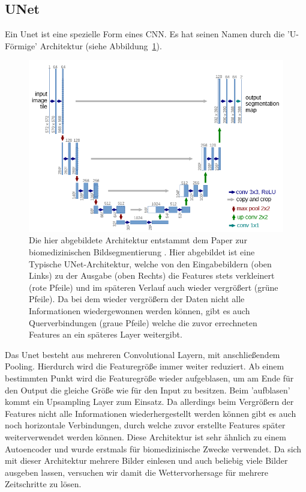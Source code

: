 \subsection{UNet}
\label{kapitelUNet}
Ein Unet ist eine spezielle Form eines CNN. Es hat seinen Namen durch die 'U-Förmige' Architektur (siehe Abbildung~\ref{imgUNetA}).
\begin{figure}[h]
	\centering
	\includegraphics[width=\linewidth]{pics/UNet_Biomedical}
	\caption[UNet aus Paper von O. Ronneberger, P. Fischer und T. Brox]{Die hier abgebildete Architektur entstammt dem Paper zur biomedizinischen Bildsegmentierung \cite{DBLP:journals/corr/RonnebergerFB15}. Hier abgebildet ist eine Typische UNet-Architektur, welche von den Eingabebildern (oben Links) zu der Ausgabe (oben Rechts) die Features stets verkleinert (rote Pfeile) und im späteren Verlauf auch wieder vergrößert (grüne Pfeile). Da bei dem wieder vergrößern der Daten nicht alle Informationen wiedergewonnen werden können, gibt es auch Querverbindungen (graue Pfeile) welche die zuvor errechneten Features an ein späteres Layer weitergibt.}
	\label{imgUNetA}
\end{figure}

Das Unet besteht aus mehreren Convolutional Layern, mit anschließendem Pooling. Hierdurch wird die Featuregröße immer weiter reduziert. Ab einem bestimmten Punkt wird die Featuregröße wieder aufgeblasen, um am Ende für den Output die gleiche Größe wie für den Input zu besitzen. Beim 'aufblasen' kommt ein Upsampling Layer zum Einsatz. Da allerdings beim Vergrößern der Features nicht alle Informationen wiederhergestellt werden können gibt es auch noch horizontale Verbindungen, durch welche zuvor erstellte Features später weiterverwendet werden können.
Diese Architektur ist sehr ähnlich zu einem Autoencoder und wurde erstmals für biomedizinische Zwecke verwendet. Da sich mit dieser Architektur mehrere Bilder einlesen und auch beliebig viele Bilder ausgeben lassen, versuchen wir damit die Wettervorhersage für mehrere Zeitschritte zu lösen.

